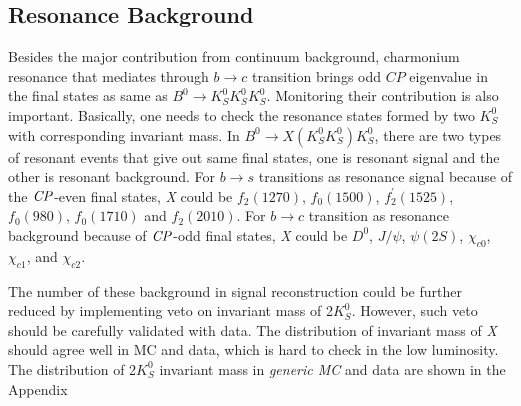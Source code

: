 \subsection{Resonance Background}
Besides the major contribution from continuum background, charmonium resonance that mediates through $b \to c$ transition brings odd $\textit{CP}$ eigenvalue in the final states as same as $B^0 \to K_S^0  K_S^0  K_S^0$. Monitoring their contribution is also important. Basically, one needs to check the resonance states formed by two $K_S^0$ with corresponding invariant mass. In $B^0 \to X(K_S^0 K_S^0) K_S^0$,  there are two types of resonant events that give out same final states, one is resonant signal and the other is resonant background. For $b \to s$ transitions as resonance signal because of the $\it{CP}$-even final states, \textit{X} could be $f_2(1270)$, $f_0(1500)$, $f_{2}^{'}(1525)$, $f_0(980)$, $f_0(1710)$ and $f_2(2010)$. For $b \to c$ transition as resonance background because of $\it{CP}$-odd final states, \textit{X} could be $D^0$, $J/\psi$, $\psi(2S)$,  $\chi_{c0}$, $\chi_{c1}$, and $\chi_{c2}$.

The number of these background in signal reconstruction could be further reduced by implementing veto on invariant mass of 2$K_S^0$. However, such veto should be carefully validated with data. The distribution of invariant mass of \textit{X} should agree well in MC and data, which is hard to check in the low luminosity. The distribution of 2$K_S^0$ invariant mass in \textit{generic MC} and data are shown in the Appendix 


